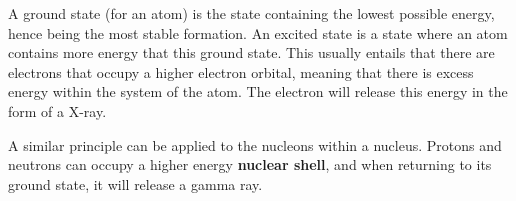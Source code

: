 \documentclass[
]{article}
\begin{document}
A ground state (for an atom) is the state containing the lowest possible
energy, hence being the most stable formation. An excited state is a
state where an atom contains more energy that this ground state. This
usually entails that there are electrons that occupy a higher electron
orbital, meaning that there is excess energy within the system of the
atom. The electron will release this energy in the form of a X-ray.

A similar principle can be applied to the nucleons within a nucleus.
Protons and neutrons can occupy a higher energy \textbf{nuclear shell},
and when returning to its ground state, it will release a gamma ray.
\end{document}
